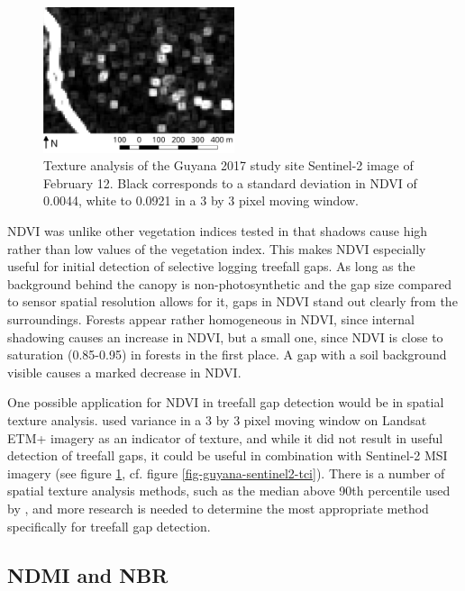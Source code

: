 \documentclass[a4paper,12pt]{scrbook}
\begin{document}
\begin{figure}
  \centering
  \includegraphics[width=0.5\textwidth]{thesis-figures/16-guyana17-ndvi-texture}
  \caption{Texture analysis of the Guyana 2017 study site Sentinel-2 image of February 12. Black corresponds to a standard deviation in \ac{NDVI} of 0.0044, white to 0.0921 in a 3 by 3 pixel moving window.}
  \label{fig-ndvi-texture}
\end{figure}

\ac{NDVI} was unlike other vegetation indices tested in that shadows cause high rather than low values of the vegetation index. This makes \ac{NDVI} especially useful for initial detection of selective logging treefall gaps. As long as the background behind the canopy is non-photosynthetic and the gap size compared to sensor spatial resolution allows for it, gaps in \ac{NDVI} stand out clearly from the surroundings. Forests appear rather homogeneous in \ac{NDVI}, since internal shadowing causes an increase in \ac{NDVI}, but a small one, since \ac{NDVI} is close to saturation (0.85-0.95) in forests in the first place. A gap with a soil background visible causes a marked decrease in \ac{NDVI}.

One possible application for \ac{NDVI} in treefall gap detection would be in spatial texture analysis. \citet{asner_remote_2002} used variance in a 3 by 3 pixel moving window on Landsat \ac{ETM+} imagery as an indicator of texture, and while it did not result in useful detection of treefall gaps, it could be useful in combination with Sentinel-2 \ac{MSI} imagery (see figure \ref{fig-ndvi-texture}, cf. figure \ref{fig-guyana-sentinel2-tci}). There is a number of spatial texture analysis methods, such as the median above 90th percentile used by \citet{hamunyela_using_2016}, and more research is needed to determine the most appropriate method specifically for treefall gap detection.

\subsection{NDMI and NBR}
\end{document}
